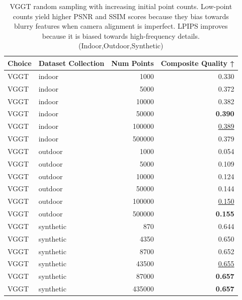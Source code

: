 \begin{table}[H]
\caption{\ifdefined\customcaption \customcaption \else VGGT random sampling with increasing initial point counts. Low-point counts yield higher PSNR and SSIM scores because they bias towards blurry features when camera alignment is imperfect. LPIPS improves because it is biased towards high-frequency details. (Indoor,Outdoor,Synthetic) \fi}
\label{tab:03_sampling_mode_single_indoor,outdoor,synthetic}
\centering
\scriptsize
\begin{tabular}{llrr}
\toprule
Choice & Dataset Collection & Num Points & Composite Quality ↑ \\
\midrule
VGGT & indoor & 1000 & 0.330 \\
VGGT & indoor & 5000 & 0.372 \\
VGGT & indoor & 10000 & 0.382 \\
VGGT & indoor & 50000 & \textbf{0.390} \\
VGGT & indoor & 100000 & \underline{0.389} \\
VGGT & indoor & 500000 & 0.379 \\
\midrule
VGGT & outdoor & 1000 & 0.054 \\
VGGT & outdoor & 5000 & 0.109 \\
VGGT & outdoor & 10000 & 0.124 \\
VGGT & outdoor & 50000 & 0.144 \\
VGGT & outdoor & 100000 & \underline{0.150} \\
VGGT & outdoor & 500000 & \textbf{0.155} \\
\midrule
VGGT & synthetic & 870 & 0.644 \\
VGGT & synthetic & 4350 & 0.650 \\
VGGT & synthetic & 8700 & 0.652 \\
VGGT & synthetic & 43500 & \underline{0.655} \\
VGGT & synthetic & 87000 & \textbf{0.657} \\
VGGT & synthetic & 435000 & \textbf{0.657} \\
\bottomrule
\end{tabular}
\end{table}